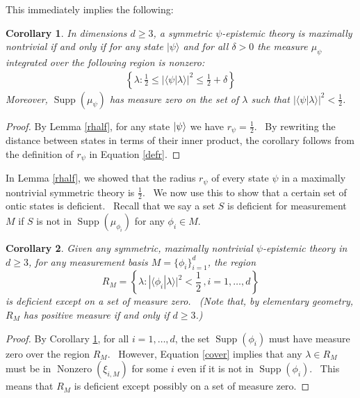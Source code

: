 \documentclass[letterpaper,11pt]{article}
\newtheorem{cor}{Corollary}
\newcommand{\ket}[1]{\mbox{$ | #1 \rangle $}}
\DeclareMathOperator{\supp}{Supp}
\DeclareMathOperator{\nz}{Nonzero}
\begin{document}
This immediately implies the following:


\begin{cor}
\label{maxnontriviallem} In dimensions $d\geq 3$, a symmetric $\psi$-epistemic theory is maximally
nontrivial if and only if for any state $ | \psi \rangle $ and for all $\delta >0$ the measure $%
\mu_\psi$ integrated over the following region is nonzero:
\begin{eqnarray}
\left\{\lambda:\frac{1}{2}\leq| \langle \psi | \lambda \rangle %
|^2\leq \frac{1}{2}+\delta\right\}  \label{maxnontrivial}
\end{eqnarray}
Moreover, $\supp(\mu_{\psi})$ has measure zero on the set of $\lambda$ such
that $| \langle \psi | \lambda \rangle |^2 <\frac{1}{2}$.
\end{cor}
\begin{proof}
By Lemma \ref{rhalf}, for any state $\ket{\psi}$ we have $r_{\psi}=\frac{1}{2}$. \ By rewriting the distance between states in terms of their inner product, the corollary follows from the definition of $r_{\psi}$ in Equation \ref{defr}.
\end{proof}


In Lemma \ref{rhalf}, we showed that the radius $r_\psi$ of every state $\psi$ in a maximally nontrivial symmetric theory is $\frac{1}{2}$. \ We now use this to show that a certain set of ontic states is deficient. \ Recall that we say a set $S$ is deficient for measurement $M$ if $S$ is not in $\supp(\mu_{\phi_i})$ for any $\phi_i \in M$.


\begin{cor}
\label{deficient} Given any symmetric, maximally nontrivial $\psi$-epistemic
theory in $d\geq 3$, for any measurement basis $M=\{\phi_i\}_{i=1}^d$, the
region \[R_M = \left\{\lambda:| \langle \phi_i | \lambda \rangle |^2 <%
\frac{1}{2}\,, i=1,\ldots,d\right\}\] is deficient except on a set of measure
zero. \ (Note that, by elementary geometry, $R_M$ has positive measure if and only if $d\geq 3$.)
\end{cor}

\begin{proof}
By Corollary \ref{maxnontriviallem}, for all $i=1,\ldots,d$, the set $\supp(\phi_i)$ must have measure zero over the region $R_M$. \ However, Equation \ref{cover} implies that any $\lambda\in R_M$ must be in $\nz(\xi_{i,M})$ for some $i$ even if it is not in $\supp(\phi_i)$. \ This means that $R_M$ is deficient except possibly on a set of measure zero.
\end{proof}
\end{document}
